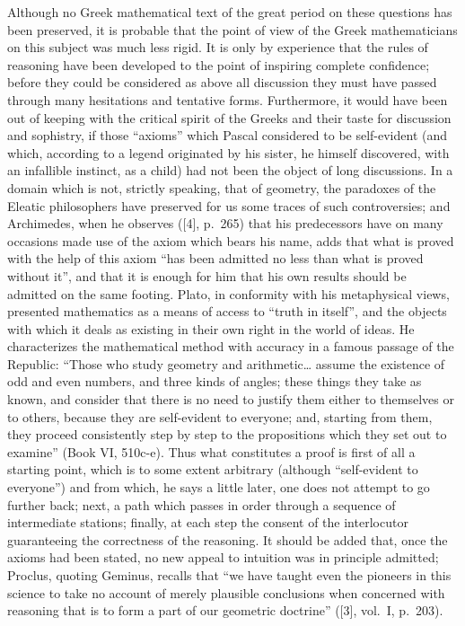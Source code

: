 Although no Greek mathematical text of the great period on these questions has been preserved, it is probable that the point of view of the Greek mathematicians on this subject was much less rigid. It is only by experience that the rules of reasoning have been developed to the point of inspiring complete confidence; before they could be considered as above all discussion they must have passed through many hesitations and tentative forms. Furthermore, it would have been out of keeping with the critical spirit of the Greeks and their taste for discussion and sophistry, if those ``axioms'' which Pascal considered to be self-evident (and which, according to a legend originated by his sister, he himself discovered, with an infallible instinct, as a child) had not been the object of long discussions. In a domain which is not, strictly speaking, that of geometry, the paradoxes of the Eleatic philosophers have preserved for us some traces of such controversies; and Archimedes, when he observes ({[}4{]}, p.~265) that his predecessors have on many occasions made use of the axiom which bears his name, adds that what is proved with the help of this axiom ``has been admitted no less than what is proved without it'', and that it is enough for him that his own results should be admitted on the same footing. Plato, in conformity with his metaphysical views, presented mathematics as a means of access to ``truth in itself'', and the objects with which it deals as existing in their own right in the world of ideas. He characterizes the mathematical method with accuracy in a famous passage of the Republic: ``Those who study geometry and arithmetic\ldots{} assume the existence of odd and even numbers, and three kinds of angles; these things they take as known, and consider that there is no need to justify them either to themselves or to others, because they are self-evident to everyone; and, starting from them, they proceed consistently step by step to the propositions which they set out to examine'' (Book VI, 510c-e). Thus what constitutes a proof is first of all a starting point, which is to some extent arbitrary (although ``self-evident to everyone'') and from which, he says a little later, one does not attempt to go further back; next, a path which passes in order through a sequence of intermediate stations; finally, at each step the consent of the interlocutor guaranteeing the correctness of the reasoning. It should be added that, once the axioms had been stated, no new appeal to intuition was in principle admitted; Proclus, quoting Geminus, recalls that ``we have taught even the pioneers in this science to take no account of merely plausible conclusions when concerned with reasoning that is to form a part of our geometric doctrine'' ({[}3{]}, vol.~I, p.~203).


